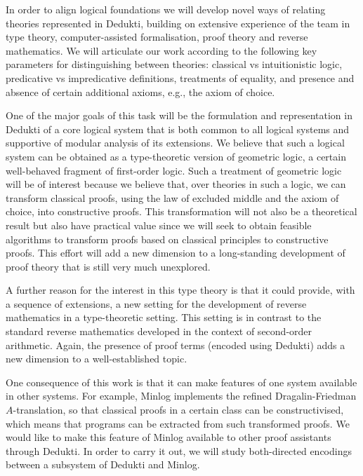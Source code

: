In order to align logical foundations we will develop novel ways of
relating theories represented in Dedukti, building on extensive
experience of the team in type theory, computer-assisted
formalisation, proof theory and reverse mathematics. We will
articulate our work according to the following key parameters for
distinguishing between theories: classical vs intuitionistic logic,
predicative vs impredicative definitions, treatments of equality, and
presence and absence of certain additional axioms, e.g., the axiom of
choice.

One of the major goals of this task will be the formulation and
representation in Dedukti of a core logical system that is both common
to all logical systems and supportive of modular analysis of its
extensions. We believe that such a logical system can be obtained as a
type-theoretic version of geometric logic, a certain well-behaved
fragment of first-order logic.  Such a treatment of geometric logic
will be of interest because we
believe that, over theories in such a logic, we can transform
classical proofs, using the law of excluded middle and the axiom of
choice, into constructive proofs.  This transformation will not also be
a theoretical result but also have practical value since we 
will seek to obtain feasible algorithms to
transform proofs based on classical principles to constructive proofs.
This effort will add a new dimension to a long-standing development of
proof theory that is still very much unexplored.

A further reason for the interest in this type theory is that it could
provide, with a sequence of extensions, a new setting for the
development of reverse mathematics in a type-theoretic setting. This
setting is in contrast to the standard reverse mathematics developed
in the context of second-order arithmetic. Again, the presence of
proof terms (encoded using Dedukti) adds a new dimension to a
well-established topic.

One consequence of this work is that it can make features of one
system available in other systems. For example, Minlog implements the
refined Dragalin-Friedman $A$-translation, so that classical proofs in
a certain class can be constructivised, which means that programs can
be extracted from such transformed proofs.  We would like to make this
feature of Minlog available to other proof assistants through Dedukti.
In order to carry it out, we will study both-directed encodings
between a subsystem of Dedukti and Minlog.

